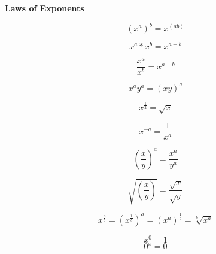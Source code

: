 \documentclass{article}
\begin{document}
\textbf{Laws of Exponents}

\begin{equation}
\left( {x^a } \right)^b = x^{\left( {ab} \right)}
\end{equation}

\begin{equation}
x^{a} * x^{b} = x^{a+b}
\end{equation}

\begin{equation}
\frac{x^{a}}{  x^{b}} = x^{a-b}
\end{equation}

\begin{equation}
x^{a}  y^{a} = \left(xy\right)^{a}
\end{equation}

\begin{equation}
x^{\frac{1}{2}} = \sqrt{x}
\end{equation}

\begin{equation}
x^{-a} = \frac{1}{x^{a}}
\end{equation}

\begin{equation}
\left( {\frac{x}{y}} \right)^a =  \frac{x^a}{y^a}
\end{equation}

\begin{equation}
\sqrt{\left(\frac{x}{y}\right)} = \frac{\sqrt{x}}{\sqrt{y}}
\end{equation}

\begin{equation}
x^{\frac{a}{b}} = \left( x^{\frac{1}{b}} \right)^{a} =\left( x^{a} \right)^{\frac{1}{b}} = \sqrt[b]{x^{a}}
\end{equation}

\begin{equation}
x^{0} = 1
\end{equation}
\begin{equation}
0^{x} = 0
\end{equation}
\end{document}
